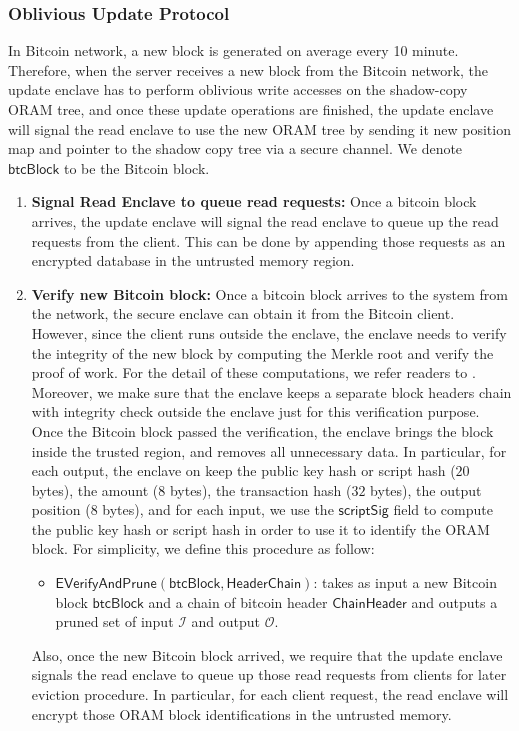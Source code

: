 \subsubsection{Oblivious Update Protocol}
In Bitcoin network, a new block is generated on average every 10 minute. 
Therefore, when the server receives a new block from the Bitcoin network, the update enclave has to perform oblivious write accesses on the shadow-copy ORAM tree,
and once these update operations are finished, the update enclave will signal the read enclave to use the new ORAM tree by sending it new position map and pointer to the shadow copy tree via a secure channel. 
We denote $\mathsf{btcBlock}$ to be the Bitcoin block. 
\begin{enumerate}

	\item \textbf{Signal Read Enclave to queue read requests:} Once a bitcoin block arrives,  the update enclave will signal the read enclave to queue up the read requests from the client. This can be done by appending those requests as an encrypted database in the untrusted memory region. 
	\item \textbf{Verify new Bitcoin block: } Once a bitcoin block arrives to the system from the network, the secure enclave can obtain it from the Bitcoin client. 
	However, since the client runs outside the enclave, the enclave needs to verify the integrity of the new block by computing the Merkle root and verify the proof of work. 
	For the detail of these computations, we refer readers to \cite{btc-reference}. 
	Moreover, we make sure that the enclave keeps a separate block headers chain with integrity check outside the enclave just for this verification purpose. 
	Once the Bitcoin block passed the verification, the enclave brings the block inside the trusted region, and removes all unnecessary data. In particular, for each output, the enclave on keep the public key hash or script hash ($20$ bytes), the amount ($8$ bytes), the transaction hash ($32$ bytes), the output position ($8$ bytes), and for each input, we use the $\mathsf{scriptSig}$ field to compute the public key hash or script hash in order to use it to identify the ORAM block. For simplicity, we define this procedure as follow:
	\begin{itemize}
		\item $\mathbf{\mathsf{EVerifyAndPrune(btcBlock,HeaderChain)}}$: takes as input a new Bitcoin block $\mathsf{btcBlock}$ and a chain of bitcoin header $\mathsf{ChainHeader}$  and outputs a pruned set of input $\mathcal I$ and output $\mathcal O$.
	\end{itemize}
	Also, once the new Bitcoin block arrived, we require that the update enclave signals the read enclave to queue up those read requests from clients for later eviction procedure. In particular, for each client request, the read enclave will encrypt those ORAM block identifications in the untrusted memory. 


\end{enumerate}
